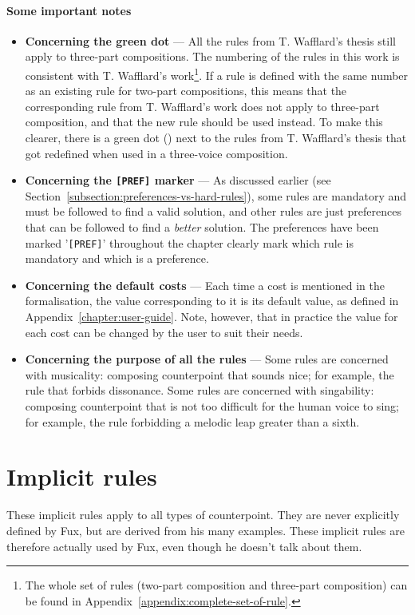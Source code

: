 \paragraph*{Some important notes}
\begin{itemize}
    \item \textbf{Concerning the green dot} ---
    All the rules from T. Wafflard's thesis still apply to three-part compositions. The numbering of the rules in this work is consistent with T. Wafflard's work\footnote{The whole set of rules (two-part composition and three-part composition) can be found in Appendix~\ref{appendix:complete-set-of-rule}.}. If a rule is defined with the same number as an existing rule for two-part compositions, this means that the corresponding rule from T. Wafflard's work does not apply to three-part composition, and that the new rule should be used instead. To make this clearer, there is a green dot (\greendot) next to the rules from T. Wafflard's thesis that got redefined when used in a three-voice composition.
    \item \textbf{Concerning the \texttt{[PREF]} marker} ---
    As discussed earlier (see Section~\ref{subsection:preferences-vs-hard-rules}), some rules are mandatory and must be followed to find a valid solution, and other rules are just preferences that can be followed to find a \textit{better} solution. The preferences have been marked '\texttt{[PREF]}' throughout the chapter clearly mark which rule is mandatory and which is a preference.

    \item \textbf{Concerning the default costs} --- Each time a cost is mentioned in the formalisation, the value corresponding to it is its default value, as defined in Appendix~\ref{chapter:user-guide}. Note, however, that in practice the value for each cost can be changed by the user to suit their needs.
    \item \textbf{Concerning the purpose of all the rules} --- 
    Some rules are concerned with musicality: composing counterpoint that sounds nice; for example, the rule that forbids dissonance. Some rules are concerned with singability: composing counterpoint that is not too difficult for the human voice to sing; for example, the rule forbidding a melodic leap greater than a sixth.

\end{itemize}

\section{Implicit rules}
These implicit rules apply to all types of counterpoint. They are never explicitly defined by Fux, but are derived from his many examples. These implicit rules are therefore actually used by Fux, even though he doesn't talk about them.


